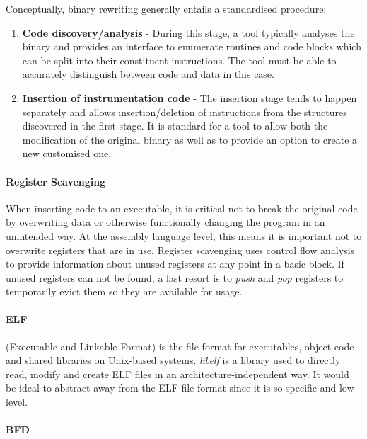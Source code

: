 Conceptually, binary rewriting generally entails a standardised procedure:

\begin{enumerate}
 \item \textbf{Code discovery/analysis} - During this stage, a tool typically analyses the binary and provides an interface to enumerate routines and code blocks which can be split into their constituent instructions. The tool must be able to accurately distinguish between code and data in this case.
\item \textbf{Insertion of instrumentation code} - The insertion stage tends to happen separately and allows insertion/deletion of instructions from the structures discovered in the first stage. It is standard for a tool to allow both the modification of the original binary as well as to provide an option to create a new customised one.
\end{enumerate}

\paragraph{Register Scavenging}

When inserting code to an executable, it is critical not to break the original code by overwriting data or otherwise functionally changing the program in an unintended way. At the assembly language level, this means it is important not to overwrite registers that are in use. Register scavenging uses control flow analysis to provide information about unused registers at any point in a basic block\cite{qpt}. If unused registers can not be found, a last resort is to \emph{push} and \emph{pop} registers to temporarily evict them so they are available for usage.

\paragraph{ELF}

(Executable and Linkable Format) is the file format for executables, object code and shared libraries on Unix-based systems. \emph{libelf} is a library used to directly read, modify and create ELF files in an architecture-independent way. It would be ideal to abstract away from the ELF file format since it is so specific and low-level.

\paragraph{BFD}

